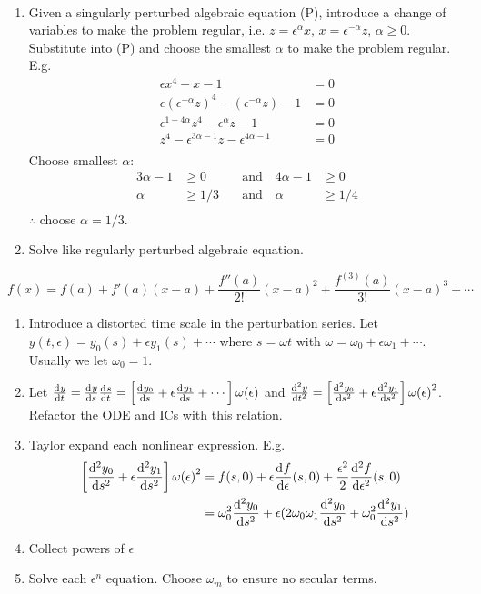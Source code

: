 \item[Singularly Perturbed Algebraic Solutions] \hfill \\
  \begin{enumerate}
  \item Given a singularly perturbed algebraic equation (P), introduce a change
    of variables to make the problem regular, i.e. $z=\epsilon^\alpha x$,
    $x=\epsilon^{-\alpha}z$, $\alpha\ge0$. Substitute into (P) and choose the
    smallest $\alpha$ to make the problem regular. E.g.
    \begin{align*}
      \epsilon x^4-x-1&=0 \\
      \epsilon{(\epsilon^{-\alpha}z)}^4-(\epsilon^{-\alpha}z)-1&=0 \\
      \epsilon^{1-4\alpha}z^4-\epsilon^{\alpha}z-1&=0 \\
      z^4-\epsilon^{3\alpha-1}z-\epsilon^{4\alpha-1}&=0 \\
    \end{align*}
    Choose smallest $\alpha$:
    \begin{align*}
      3\alpha-1&\ge0 \quad&\text{and}\quad 4\alpha-1&\ge0 \\
      \alpha&\ge1/3 \quad&\text{and}\quad \alpha&\ge1/4 \\
    \end{align*}
    $\therefore$ choose $\alpha=1/3$.
  \item Solve like regularly perturbed algebraic equation.
  \end{enumerate}

\item[Taylor Series]
  $$f(x)=f(a)+f'(a)(x-a)+\frac{f''(a)}{2!}{(x-a)}^2+\frac{f^{(3)}(a)}{3!}{(x-a)}^3+\cdots$$

\item[Poincar\'e-Lindstedt Method] \hfill
  \begin{enumerate}
  \item Introduce a distorted time scale in the perturbation series. Let
    $y(t,\epsilon)=y_0(s) + \epsilon y_1(s) + \cdots$ where $s=\omega t$ with
    $\omega = \omega_0 + \epsilon\omega_1 + \cdots$. Usually we let
    $\omega_0=1$.
  \item Let $\od{y}{t}=\od{y}{s}\od{s}{t}=\left[\od{y_0}{s} +
      \epsilon\od{y_1}{s} + \cdots\right] \omega(\epsilon)$ and
    $\od[2]{y}{t}=\left[\od[2]{y_0}{s} +
      \epsilon\od[2]{y_1}{s}\right]{\omega(\epsilon)}^2$. Refactor the ODE and
    ICs with this relation.
  \item Taylor expand each nonlinear expression. E.g.
    \begin{align*}
      \left[ \od[2]{y_0}{s}+\epsilon\od[2]{y_1}{s} \right]{\omega(\epsilon)}^2
      &= f(s,0)+\epsilon\od{f}{\epsilon}(s,0) +
        \frac{\epsilon^2}{2}\od[2]{f}{\epsilon}(s,0) \\
      &= \omega_0^2 \od[2]{y_0}{s} + \epsilon(2\omega_0\omega_1\od[2]{y_0}{s} +
        \omega_0^2\od[2]{y_1}{s}) \
    \end{align*}
  \item Collect powers of $\epsilon$
  \item Solve each $\epsilon^n$ equation. Choose $\omega_m$ to ensure no secular
    terms.
  \end{enumerate}
